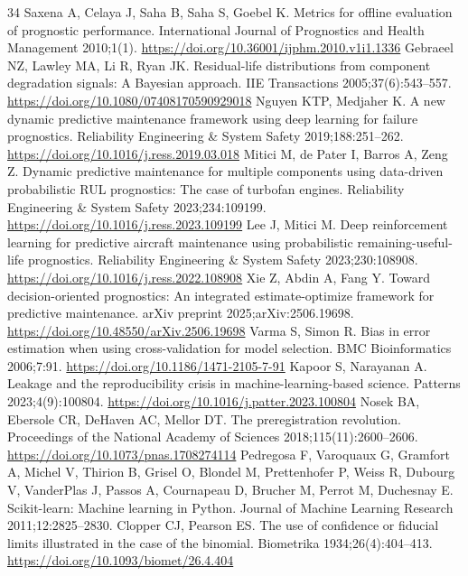 \documentclass[a4paper,fleqn,doubleblind]{cas-dc}
\begin{document}
\begin{thebibliography}{34}
 Saxena A, Celaya J, Saha B, Saha S, Goebel K. Metrics for offline evaluation of prognostic performance. International Journal of Prognostics and Health Management 2010;1(1). \url{https://doi.org/10.36001/ijphm.2010.v1i1.1336}
 Gebraeel NZ, Lawley MA, Li R, Ryan JK. Residual-life distributions from component degradation signals: A Bayesian approach. IIE Transactions 2005;37(6):543--557. \url{https://doi.org/10.1080/07408170590929018}
 Nguyen KTP, Medjaher K. A new dynamic predictive maintenance framework using deep learning for failure prognostics. Reliability Engineering \& System Safety 2019;188:251--262. \url{https://doi.org/10.1016/j.ress.2019.03.018}
 Mitici M, de Pater I, Barros A, Zeng Z. Dynamic predictive maintenance for multiple components using data-driven probabilistic RUL prognostics: The case of turbofan engines. Reliability Engineering \& System Safety 2023;234:109199. \url{https://doi.org/10.1016/j.ress.2023.109199}
 Lee J, Mitici M. Deep reinforcement learning for predictive aircraft maintenance using probabilistic remaining-useful-life prognostics. Reliability Engineering \& System Safety 2023;230:108908. \url{https://doi.org/10.1016/j.ress.2022.108908}
 Xie Z, Abdin A, Fang Y. Toward decision-oriented prognostics: An integrated estimate-optimize framework for predictive maintenance. arXiv preprint 2025;arXiv:2506.19698. \url{https://doi.org/10.48550/arXiv.2506.19698}
 Varma S, Simon R. Bias in error estimation when using cross-validation for model selection. BMC Bioinformatics 2006;7:91. \url{https://doi.org/10.1186/1471-2105-7-91}
 Kapoor S, Narayanan A. Leakage and the reproducibility crisis in machine-learning-based science. Patterns 2023;4(9):100804. \url{https://doi.org/10.1016/j.patter.2023.100804}
 Nosek BA, Ebersole CR, DeHaven AC, Mellor DT. The preregistration revolution. Proceedings of the National Academy of Sciences 2018;115(11):2600--2606. \url{https://doi.org/10.1073/pnas.1708274114}
 Pedregosa F, Varoquaux G, Gramfort A, Michel V, Thirion B, Grisel O, Blondel M, Prettenhofer P, Weiss R, Dubourg V, VanderPlas J, Passos A, Cournapeau D, Brucher M, Perrot M, Duchesnay E. Scikit-learn: Machine learning in Python. Journal of Machine Learning Research 2011;12:2825--2830.
 Clopper CJ, Pearson ES. The use of confidence or fiducial limits illustrated in the case of the binomial. Biometrika 1934;26(4):404--413. \url{https://doi.org/10.1093/biomet/26.4.404}

\end{thebibliography}
\end{document}
